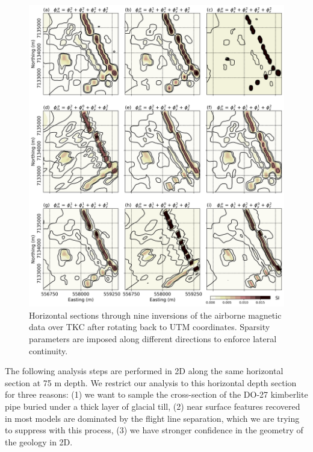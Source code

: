 \documentclass[extra,referee]{gji}
\begin{document}
\begin{figure}
\includegraphics[width=\columnwidth]{Figures/Results_MAG_TKC_Results_All.png}
\caption{Horizontal sections through nine inversions of the airborne magnetic data over TKC after rotating back to UTM coordinates. Sparsity parameters are imposed along different directions to enforce lateral continuity.}
\label{TKC_Results}
\end{figure}

The following analysis steps are performed in 2D along the same horizontal section at 75 m depth.
We restrict our analysis to this horizontal depth section for three reasons: (1) we want to sample the cross-section of the DO-27 kimberlite pipe buried under a thick layer of glacial till, (2) near surface features recovered in most models are dominated by the flight line separation, which we are trying to suppress with this process, (3) we have stronger confidence in the geometry of the geology in 2D.
\end{document}
